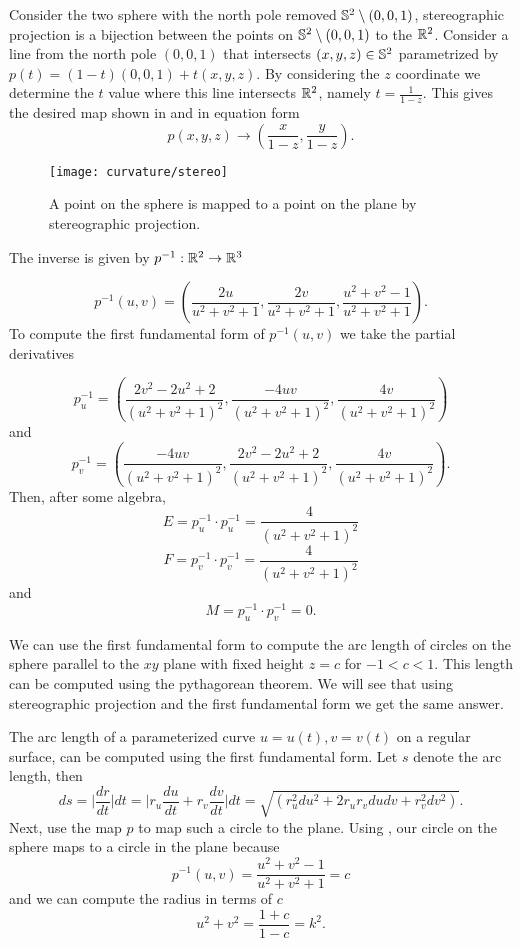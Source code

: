 \begin{example}\label{ex:stereo}
Consider the two sphere with the north pole removed $\mathbb{S}^2 \setminus (0,0,1)$,
stereographic projection is a bijection between the points on $\mathbb{S}^2 \setminus (0,0,1)$ to the $\mathbb{R}^2$.
Consider a line from the north pole $(0,0,1)$ that intersects $(x,y,z)\in \mathbb{S}^2$ parametrized by 
$p(t)=(1-t)(0,0,1)+t(x,y,z)$. By considering the $z$ coordinate we determine the $t$ value where this line
intersects $\mathbb{R}^2$, namely $t=\frac{1}{1-z}.$
This gives the desired map shown in  and in equation form
$$p(x,y,z)\to \left(\frac{x}{1-z},\frac{y}{1-z}\right).$$

\begin{figure}[htb]
	\centering
	\texttt{[image: curvature/stereo]}
	\caption{A point on the sphere is mapped to a point on the plane by stereographic projection.}
	\label{fig:stereo}
\end{figure}
	
The inverse is given by $p^{-1}:\mathbb{R}^2\to \mathbb{R}^3$

	\begin{equation}\label{eqn:stereo}
		p^{-1}(u,v)=\left(\frac{2u}{u^2+v^2+1},\frac{2v}{u^2+v^2+1},\frac{u^2+v^2-1}{u^2+v^2+1}\right).	
	\end{equation}
To compute the first fundamental form of $p^{-1}(u,v)$ we take the partial derivatives

$$p^{-1}_u=\left(\frac{2v^2-2u^2+2}{(u^2+v^2+1)^2},\frac{-4uv}{(u^2+v^2+1)^2},\frac{4v}{(u^2+v^2+1)^2}\right)$$
and 
$$p^{-1}_v=\left(\frac{-4uv}{(u^2+v^2+1)^2},\frac{2v^2-2u^2+2}{(u^2+v^2+1)^2},\frac{4v}{(u^2+v^2+1)^2}\right).$$
Then, after some algebra,
$$E=p^{-1}_u\cdot p^{-1}_u=\frac{4}{(u^2+v^2+1)^2}$$
$$F=p^{-1}_v\cdot p^{-1}_v=\frac{4}{(u^2+v^2+1)^2}$$
and
$$M=p^{-1}_u\cdot p^{-1}_v=0.$$

We can use the first fundamental form to compute
the  arc length of circles on the sphere parallel to the $xy$ plane with fixed height $z=c$ for $-1<c<1$.
This length can be computed using
the pythagorean theorem. We will see that using stereographic projection
and the first fundamental form we get the same answer.


The arc length of a parameterized curve $u=u(t), v=v(t)$ on a regular surface,
can be computed using the first fundamental form.  Let
$s$ denote the arc length, then 
$$ds=\bigg | \frac{dr}{dt}\bigg | dt = \bigg | r_u\frac{du}{dt}+r_v\frac{dv}{dt}\bigg |dt
=\sqrt{(r_u^2 du^2+2r_ur_v du dv + r_v^2dv^2)}.$$
Next, use the map $p$ to map such a circle to the plane.
Using , our circle on the sphere maps 
to a circle in the plane because
	$$p^{-1}(u,v)=\frac{u^2+v^2-1}{u^2+v^2+1}=c$$
and we can compute the radius in terms of $c$
\begin{equation}\label{eqn:radius}
	u^2+v^2=\frac{1+c}{1-c}=k^2.
\end{equation}
	

\end{example}
